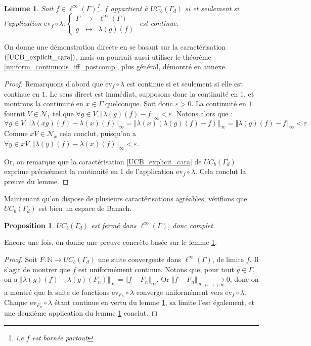 \documentclass[a4paper,12pt]{article}
\newtheorem{proposition}[theorem]{Proposition}
\newtheorem{lemma}[theorem]{Lemme}
\newcommand{\N}{\mathbb{N}}
\newcommand{\ev}{\mathrm{ev}}
\newcommand{\norm}[1]{\left\Vert #1\right\Vert}
\newcommand\fundef[3]{#1: \left\{\begin{array}{ccc}#2\\#3\end{array}\right.}
\newcommand{\ssi}{si et seulement si }
\newcommand{\comp}{\circ}
\newcommand{\nhds}{\mathcal{N}}
\newcommand{\TODO}[1]{}%
\begin{document}
\begin{lemma}\label{UCB_iff_translate}
    Soit $f\in\ell^\infty(\Gamma)$\footnote{i.e $f$ est bornée \emph{partout}}. $f$ appartient à $UC_b(\Gamma_d)$ \ssi l'application 
    $\fundef{\ev_f\comp\lambda}{\Gamma&\to&\ell^\infty(\Gamma)}{g&\mapsto&\lambda(g)(f)}$
    est continue.
\end{lemma}

On donne une démonstration directe en se basant sur la caractérisation $(\ref{UCB_explicit_cara})$, mais on 
pourrait aussi utiliser le théorème \ref{uniform_continuous_iff_postcomp}, plus général, démontré en annexe.

\begin{proof}
    Remarquons d'abord que $\ev_f\comp\lambda$ est continue \ssi elle est continue en $1$. Le sens direct est immédiat, supposons donc 
    la continuité en $1$, et montrons la continuité en $x\in\Gamma$ quelconque. Soit donc $\varepsilon>0$. La continuité en $1$ fournit 
    $V\in\nhds_1$ tel que $\forall g\in V, \norm{\lambda(g)(f) - f}_\infty<\varepsilon$. Notons alors que :
    \begin{equation*}
        \forall g\in V, \norm{\lambda(xg)(f) - \lambda(x)(f)}_\infty = \norm{\lambda(x)(\lambda(g)(f) - f)}_\infty = \norm{\lambda(g)(f) - f}_\infty < \varepsilon
    \end{equation*}
    Comme $xV\in\nhds_x$ cela conclut, puisqu'on a $\forall y\in xV, \norm{\lambda(y)(f) - \lambda(x)(f)}_\infty < \varepsilon$.

    Or, on remarque que la caractérisation \ref{UCB_explicit_cara} de $UC_b(\Gamma_d)$ exprime précisément la continuité en $1$ de l'application $\ev_f\comp\lambda$.
    Cela conclut la preuve du lemme.
\end{proof}

Maintenant qu'on dispose de plusieurs caractérisations agréables, vérifions que $UC_b(\Gamma_d)$ est bien un espace de Banach.

\begin{proposition}\label{UCB_complete}
    $UC_b(\Gamma_d)$ est fermé dans $\ell^\infty(\Gamma)$, donc complet.
\end{proposition}

Encore une fois, on donne une preuve concrète basée sur le lemme \ref{UCB_iff_translate}. 

\begin{proof}
    Soit $F:\N\to UC_b(\Gamma_d)$ une suite convergente dans $\ell^\infty(\Gamma)$, de limite $f$.
    Il s'agit de montrer que $f$ est uniformément continue. Notons que, pour tout $g\in\Gamma$, on a $\norm{\lambda(g)(f) - \lambda(g)(F_n)}_\infty = \norm{f - F_n}_\infty$.
    Or $\norm{f - F_n}_\infty\xrightarrow[n\to+\infty]{}0$, donc on a montré que la suite de fonctions $\ev_{F_n}\comp\lambda$ converge 
    uniformément vers $\ev_f\comp\lambda$. Chaque $\ev_{F_n}\comp\lambda$ étant continue en vertu du lemme \ref{UCB_iff_translate},
    sa limite l'est également, et une deuxième application du lemme \ref{UCB_iff_translate} conclut.
\end{proof}
\end{document}
